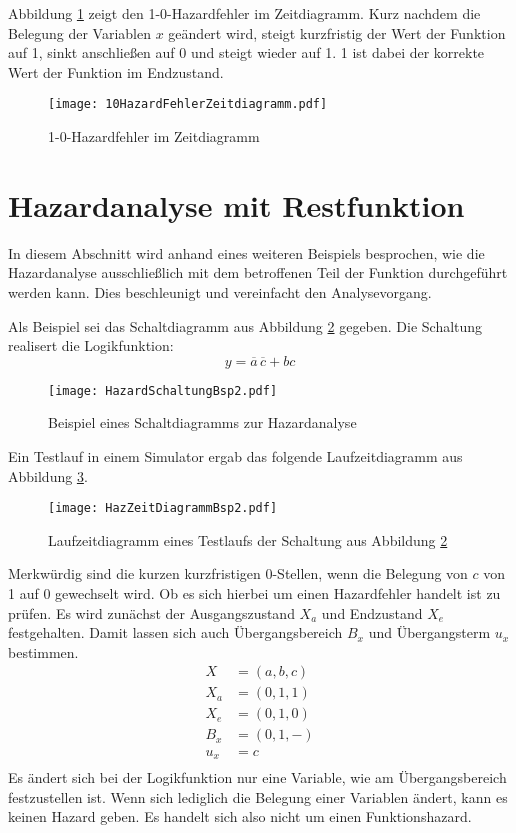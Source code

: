 Abbildung \ref{10HazZeitDiag} zeigt den 1-0-Hazardfehler im Zeitdiagramm. Kurz nachdem die Belegung der Variablen $x$ geändert wird, steigt kurzfristig der Wert der Funktion auf 1, sinkt anschließen auf 0 und steigt wieder auf 1. 1 ist dabei der korrekte Wert der Funktion im Endzustand.
\begin{figure}[htp]
	\centering
	\texttt{[image: 10HazardFehlerZeitdiagramm.pdf]}
	\caption{1-0-Hazardfehler im Zeitdiagramm}
	\label{10HazZeitDiag}
\end{figure}

\section{Hazardanalyse mit Restfunktion}
In diesem Abschnitt wird anhand eines weiteren Beispiels besprochen, wie die Hazardanalyse ausschließlich mit dem betroffenen Teil der Funktion durchgeführt werden kann. Dies beschleunigt und vereinfacht den Analysevorgang.

Als Beispiel sei das Schaltdiagramm aus Abbildung \ref{HazSchaltBsp2} gegeben. Die Schaltung realisert die Logikfunktion: 
$$y = \overline{a}\hspace{2pt}\overline{c}  + bc$$
\begin{figure}[htp]
	\centering
	\texttt{[image: HazardSchaltungBsp2.pdf]}
	\caption{Beispiel eines Schaltdiagramms zur Hazardanalyse}
	\label{HazSchaltBsp2}
\end{figure} 

Ein Testlauf in einem Simulator ergab das folgende Laufzeitdiagramm aus Abbildung \ref{HazZeitDiagBsp2}.
\begin{figure}[htp]
	\centering
	\texttt{[image: HazZeitDiagrammBsp2.pdf]}
	\caption{Laufzeitdiagramm eines Testlaufs der Schaltung aus Abbildung \ref{HazSchaltBsp2}}
	\label{HazZeitDiagBsp2}
\end{figure} 

Merkwürdig sind die kurzen kurzfristigen 0-Stellen, wenn die Belegung von $c$ von 1 auf 0 gewechselt wird. Ob es sich hierbei um einen Hazardfehler handelt ist zu prüfen. Es wird zunächst der Ausgangszustand $X_a$ und Endzustand $X_e$ festgehalten. Damit lassen sich auch Übergangsbereich $B_x$ und Übergangsterm $u_x$ bestimmen.
\begin{align*}
X   &= (a,b,c) \\
X_a &= (0,1,1) \\
X_e &= (0,1,0) \\
B_x &= (0,1,-) \\
u_x &= c \\
\end{align*}
Es ändert sich bei der Logikfunktion nur eine Variable, wie am Übergangsbereich festzustellen ist. Wenn sich lediglich die Belegung einer Variablen ändert, kann es keinen Hazard geben. Es handelt sich also nicht um einen Funktionshazard.

